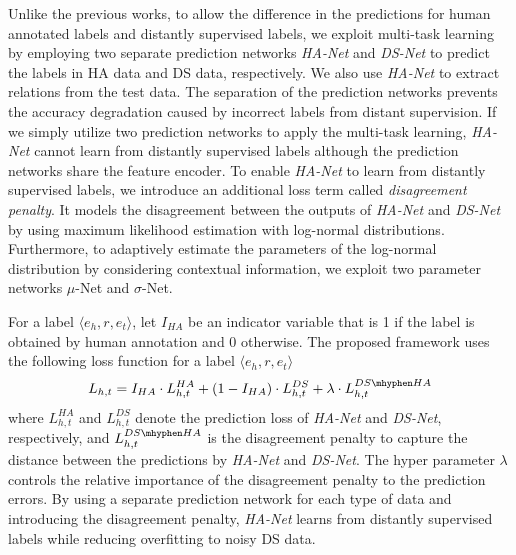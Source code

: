 \documentclass[11pt]{article}
\newcommand{\triple}[3]{\ensuremath{\langle #1,#2,#3\rangle}}
\newcommand{\hanet}{\emph{HA-Net}\xspace}
\newcommand{\dsnet}{\emph{DS-Net}\xspace}
\newcommand{\munet}{$\mu$-Net\xspace}
\newcommand{\sigmanet}{$\sigma$-Net\xspace}
\newcommand{\ehead}{e_{h}}
\newcommand{\etail}{e_{t}}
\begin{document}
Unlike the previous works, to allow the difference in the predictions for human annotated labels and distantly supervised labels, we exploit multi-task learning by employing two separate prediction networks \hanet and \dsnet to predict the labels in HA data and DS data, respectively.
We also use \hanet to extract relations from the test data.
The separation of the prediction networks prevents the accuracy degradation caused by incorrect labels from distant supervision.
If we simply utilize two prediction networks to apply the multi-task learning, \hanet cannot learn from distantly supervised labels although the prediction networks share the feature encoder.
To enable \hanet to learn from distantly supervised labels, we introduce an additional loss term called \emph{disagreement penalty}.
It models the disagreement between the outputs of \hanet and \dsnet by using maximum likelihood estimation with log-normal distributions.
Furthermore, to adaptively estimate the parameters of the log-normal distribution by considering contextual information, we exploit two parameter networks \munet and \sigmanet.



For a label \triple{\ehead}{r}{\etail}, 
let $I_{HA}$ be an indicator variable that is 1 if the label is obtained by human annotation and 0 otherwise.
The proposed framework uses the following loss function for a label \triple{\ehead}{r}{\etail}
\begin{equation}
\label{eq:loss_full}
L_{h, t} = I_{HA} \cdot L_{h,t}^{HA} + (1-I_{HA}) \cdot L_{h,t}^{DS} + \lambda \cdot L_{h,t}^{DS\mhyphen HA}
\end{equation}
where $L_{h,t}^{HA}$ and $L_{h,t}^{DS}$ denote the prediction loss of \hanet and \dsnet, respectively, and $L_{h,t}^{DS\mhyphen HA}$ is the disagreement penalty to capture the distance between the predictions by \hanet and \dsnet.
The hyper parameter $\lambda$ controls the relative importance of the disagreement penalty to the prediction errors.
By using a separate prediction network for each type of data and introducing the disagreement penalty, \hanet learns from distantly supervised labels while reducing overfitting to noisy DS data.
\end{document}
